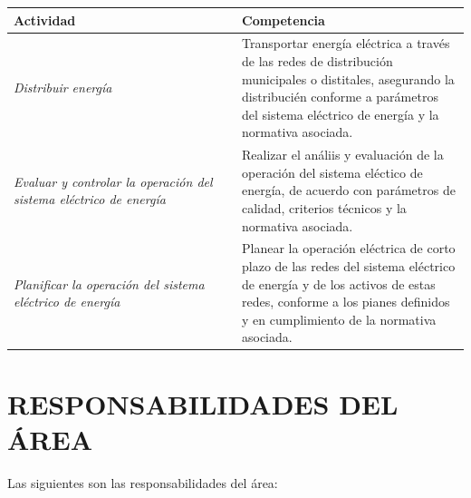 \documentclass[a5paper]{book}%
\begin{document}
\begin{table}[H]
	\begin{tabular}{|p{0.5\linewidth}|p{0.5\linewidth}|}
		\hline
		\textbf{Actividad} &  \textbf{Competencia} \\\hline
		\textit{Distribuir energía} & Transportar energía eléctrica a través de las redes de distribución municipales o distitales, asegurando la distribucién conforme a parámetros del sistema eléctrico de energía    y la normativa asociada.\\\hline
		\textit{Evaluar y controlar la operación del sistema eléctrico de energía} &  Realizar el análiis y evaluación de la operación del sistema eléctico de energía, de acuerdo con parámetros de calidad, criterios técnicos y la normativa asociada. \\\hline
		\textit{Planificar la operación del sistema eléctrico de energía} & Planear la operación eléctrica de corto plazo de las redes del sistema eléctrico de energía y de los activos de  estas redes, conforme a los pianes definidos y en cumplimiento de la normativa asociada.\\\hline
	\end{tabular}
\end{table}

\section{RESPONSABILIDADES DEL ÁREA}

Las siguientes son las responsabilidades del área:\\
\end{document}
